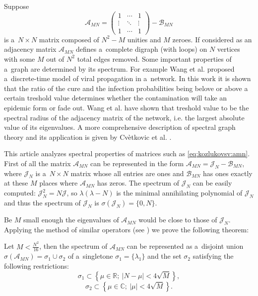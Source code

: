 Suppose
\begin{equation}\label{eq:kozlukovsv:amn}
    \mathscr{A}_{MN} =
    \begin{pmatrix}
        1 & \cdots & 1 \\
        \vdots & \ddots & \vdots \\
        1 & \cdots & 1
    \end{pmatrix} - \mathscr{B}_{MN}
\end{equation}
    is a~\( N\times N \) matrix composed of
    \( N^2 - M \) unities and \( M \) zeroes.
If considered as an adjacency matrix \( \mathscr{A}_{MN} \)
    defines a~complete digraph (with loops) on \( N \) vertices
    with some \( M \) out of \( N^2 \) total edges removed.
Some important properties of a~graph are determined by its spectrum.
For example Wang et al. \cite{epidemic} proposed a~discrete-time model
    of viral propagation in a~network.
In this work it is shown that the ratio
    of the cure and the infection probabilities
    being belove or above a certain treshold value
    determines whether the contamination will take an epidemic form
    or fade out.
Wang et al. have shown that treshold value
    to be the spectral radius of the adjacency matrix of the network,
    i.e. the largest absolute value of its eigenvalues.
A more comprehensive description of spectral graph theory
    and its application is given by Cv\`etkovic et al. \cite{cvet}.

This article analyzes spectral properties of matrices such as \eqref{eq:kozlukovsv:amn}.
First of all the matrix \( \mathscr{A}_{MN} \) can be represented in the form
    \( \mathscr{A}_{MN} = \mathcal{J}_N - \mathscr{B}_{MN} \),
    where \( \mathcal{J}_N \) is a~\( N\times N \) matrix
    whose all entries are ones
    and \( \mathcal{B}_{MN} \) has ones exactly at these \( M \)
    places where \( \mathscr{A}_{MN} \) has zeros.
The spectrum of \( \mathcal{J}_N \) can be easily computed:
    \( \mathcal{J}_N^2 = N \mathcal{J} \),
    so \( \lambda(\lambda - N) \) is the minimal
    annihilating polynomial of \( \mathcal{J}_N \)
    and thus the spectrum of \( \mathcal{J}_{N} \) is
    \( \sigma(\mathcal{J}_N) = \{ 0,N \} \).

Be \( M \) small enough
    the eigenvalues of \( \mathscr{A}_{MN} \) would be close to those of \( \mathcal{J}_N \).
Applying the method of similar operators (see \cite{baskakov-harmonic,baskakov-split})
    we prove the following theorem:
\begin{thm}\label{kozlukovsv:thm:almost-all-ones}
    Let \( M < \frac{N^2}{16} \),
    then the spectrum of \( \mathscr{A}_{MN} \)
    can be represented as a~disjoint union
    \( \sigma\left(\mathscr{A}_{MN}\right) = \sigma_1 \cup \sigma_2 \)
    of a~singletone \( \sigma_1=\{\lambda_1\} \)
    and the set \( \sigma_2 \) satisfying the following restrictions:
    \[
        \sigma_1 \subset \left\{
            \mu\in\mathbb{R};\ \lvert N - \mu \rvert < 4\sqrt{M}
            \right\},
        \]
    \[ \sigma_2 \subset \left\{ \mu\in\mathbb{C};\ \lvert \mu \rvert < 4\sqrt{M} \right\}. \]
\end{thm}

